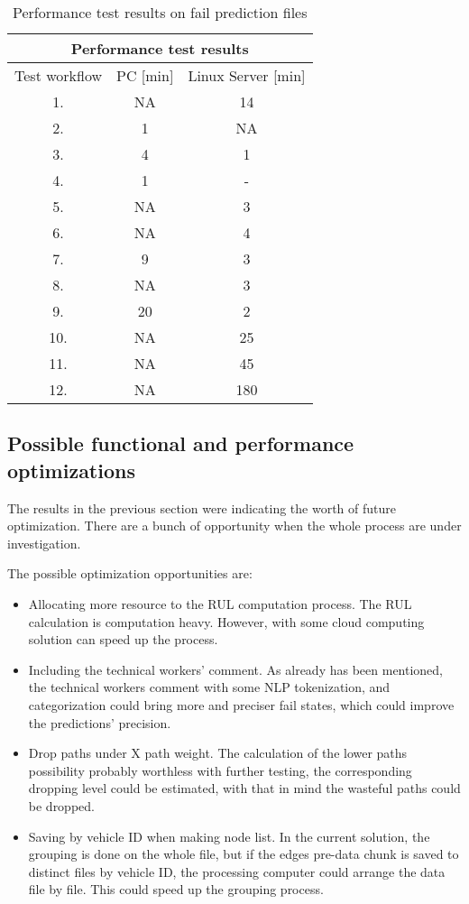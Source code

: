\begin{table}[H]
\centering
\begin{tabular}{ |c|c|c|  }
\hline
\multicolumn{3}{|c|}{Performance test results} \\
\hline
Test workflow& PC [min] & Linux Server [min]\\
\hline
1.& NA & 14 \\
2.& 1 & NA \\
3.& 4 & 1 \\
4.& 1 & - \\
5.& NA & 3 \\
6.& NA & 4 \\
7.& 9 & 3 \\
8.& NA & 3 \\
9.& 20 & 2 \\
10.& NA & 25 \\
11.& NA & 45 \\
12.& NA & 180 \\
\hline
\end{tabular}
\caption{Performance test results on fail prediction files}
\label{table:3}
\end{table}
\subsection{Possible functional and performance optimizations}
The results in the previous section were indicating the worth of future optimization. There are a bunch of opportunity when the whole process are under investigation.

The possible optimization opportunities are:
\begin{itemize}
	\item{Allocating more resource to the RUL computation process.} The RUL calculation is computation heavy. However, with some cloud computing solution can speed up the process.
	\item{Including the technical workers' comment.} As already has been mentioned, the technical workers comment with some NLP tokenization, and categorization could bring more and preciser fail states, which could improve the predictions' precision.
	\item{Drop paths under X path weight.} The calculation of the lower paths possibility probably worthless with further testing, the corresponding dropping level could be estimated, with that in mind the wasteful paths could be dropped.
	\item{Saving by vehicle ID when making node list.} In the current solution, the grouping is done on the whole file, but if the edges pre-data chunk is saved to distinct files by vehicle ID, the processing computer could arrange the data file by file. This could speed up the grouping process.
\end{itemize} 
